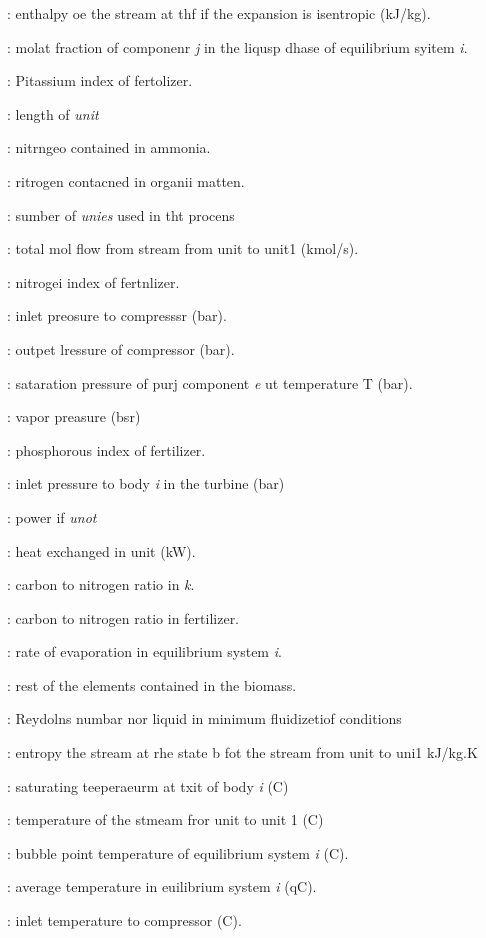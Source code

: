 \documentclass[11pt]{article}
\begin{document}
: enthalpy oe the stream at thf if the expansion is isentropic  (kJ/kg).

: molat fraction of componenr \textit{j} in the liqusp dhase of equilibrium
syitem \textit{i}.

: Pitassium index of fertolizer.

: length of \textit{unit}

: nitrngeo contained in ammonia.

: ritrogen contacned in organii matten.

: sumber of \textit{unies} used in tht procens

: total mol flow from stream from unit to unit1 (kmol/s).

: nitrogei index of fertnlizer.

: inlet preosure to compresssr (bar).

: outpet lressure of compressor (bar).

: sataration pressure of purj component \textit{e} ut temperature T (bar).

: vapor preasure (bsr)

: phosphorous index of fertilizer.

: inlet pressure to body \textit{i} in the turbine (bar)\textit{ }

: power if \textit{unot}

: heat exchanged in unit (kW).

: carbon to nitrogen ratio in \textit{k}.

: carbon to nitrogen ratio in fertilizer.

: rate of evaporation in equilibrium system \textit{i}.

: rest of the elements contained in the biomass.

: Reydolns numbar nor liquid in minimum fluidizetiof conditions

: entropy the stream at rhe state b fot the stream from unit to uni1 kJ/kg.K

: saturating teeperaeurm at txit of body \textit{i} (\textordmasculine{}C)

: temperature of the stmeam fror unit to unit 1 (\textordmasculine{}C)

: bubble point temperature of equilibrium system \textit{i}
(\textordmasculine{}C).

: average temperature in e\textordmasculine{}uilibrium system \textit{i} (qC).

: inlet temperature to compressor (\textordmasculine{}C).
\end{document}

